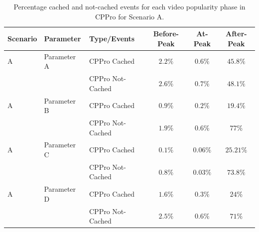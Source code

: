 \documentclass[10pt,final,journal,a4paper]{IEEEtran}
\begin{document}
\begin{table}[!t]
\caption{Percentage cached and not-cached events for each video popularity phase in CPPro for Scenario A.}
\label{tab:stacked2a}
\centering
\begin{tabular}{|l|l|l|c|c|c|}
\hline
Scenario & Parameter & Type/Events & Before-Peak & At-Peak  & After-Peak \\
\hline
A & Parameter A & CPPro Cached & $2.2\%$ & $0.6\%$ & $45.8\%$  \\
\hline
 & & CPPro Not-Cached & $2.6\%$ & $0.7\%$ & $48.1\%$ \\
 \hline

A & Parameter B & CPPro Cached & $0.9\%$ & $0.2\%$ & $19.4\%$ \\
\hline
 & & CPPro Not-Cached & $1.9\%$ & $0.6\%$ & $77\%$ \\
\hline

A & Parameter C & CPPro Cached & $0.1\%$ & $0.06\%$ & $25.21\%$ \\
\hline
 & & CPPro Not-Cached & $0.8\%$ & $0.03\%$ & $73.8\%$ \\
\hline

A & Parameter D & CPPro Cached & $1.6\%$ & $0.3\%$ & $24\%$ \\
\hline
 & & CPPro Not-Cached & $2.5\%$ & $0.6\%$ & $71\%$ \\
\hline

\end{tabular}
\end{table}
\end{document}
